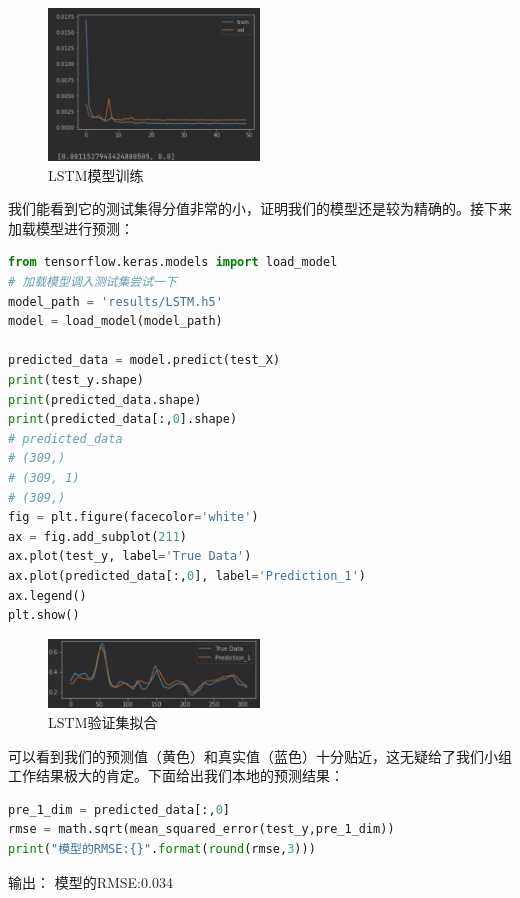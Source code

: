 \documentclass[11pt,a4paper]{elegantpaper}
\begin{document}
\begin{multicols}{2}
\begin{figure}[H]
  \centering
  \includegraphics[width=0.5\textwidth]{images/FGN.png}
  \caption{LSTM模型训练} 
\end{figure}

我们能看到它的测试集得分值非常的小，证明我们的模型还是较为精确的。接下来加载模型进行预测：

\begin{lstlisting}[language=Python]
from tensorflow.keras.models import load_model
# 加载模型调入测试集尝试一下
model_path = 'results/LSTM.h5'
model = load_model(model_path)

predicted_data = model.predict(test_X)
print(test_y.shape)
print(predicted_data.shape)
print(predicted_data[:,0].shape)
# predicted_data
# (309,)
# (309, 1)
# (309,)
fig = plt.figure(facecolor='white')
ax = fig.add_subplot(211)
ax.plot(test_y, label='True Data')
ax.plot(predicted_data[:,0], label='Prediction_1')
ax.legend()
plt.show()
\end{lstlisting}

\begin{figure}[H]
  \centering
  \includegraphics[width=0.5\textwidth]{images/FGNN.png}
  \caption{LSTM验证集拟合} 
\end{figure}

可以看到我们的预测值（黄色）和真实值（蓝色）十分贴近，这无疑给了我们小组工作结果极大的肯定。下面给出我们本地的预测结果：

\begin{lstlisting}[language=Python]
pre_1_dim = predicted_data[:,0]
rmse = math.sqrt(mean_squared_error(test_y,pre_1_dim))
print("模型的RMSE:{}".format(round(rmse,3)))
\end{lstlisting}

输出：
模型的RMSE:0.034



\end{multicols}
\end{document}
